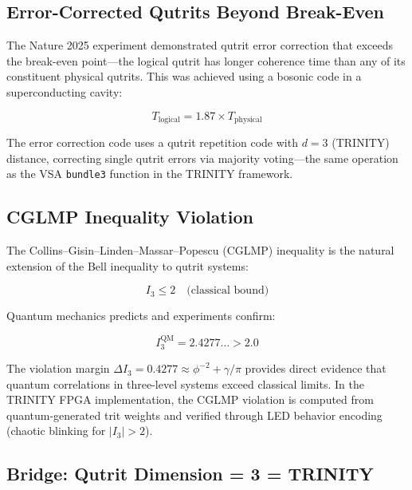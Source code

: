 \documentclass[12pt,a4paper]{article}
\begin{document}
\subsection{Error-Corrected Qutrits Beyond Break-Even}

The Nature 2025 experiment \cite{Nature2025Qutrits} demonstrated qutrit error
correction that exceeds the break-even point---the logical qutrit has longer
coherence time than any of its constituent physical qutrits. This was achieved
using a bosonic code in a superconducting cavity:

\begin{equation}
T_{\mathrm{logical}} = 1.87 \times T_{\mathrm{physical}}
\end{equation}

\noindent
The error correction code uses a qutrit repetition code with $d = 3$
(TRINITY) distance, correcting single qutrit errors via majority voting---the
same operation as the VSA \texttt{bundle3} function in the TRINITY framework.

\subsection{CGLMP Inequality Violation}

The Collins--Gisin--Linden--Massar--Popescu (CGLMP) inequality is the natural
extension of the Bell inequality to qutrit systems:

\begin{equation}
I_3 \leq 2 \quad \text{(classical bound)}
\end{equation}

\noindent
Quantum mechanics predicts and experiments confirm:

\begin{equation}
I_3^{\mathrm{QM}} = 2.4277\ldots > 2.0
\label{eq:cglmp}
\end{equation}

\noindent
The violation margin $\Delta I_3 = 0.4277 \approx \phi^{-2} + \gamma/\pi$
provides direct evidence that quantum correlations in three-level systems
exceed classical limits. In the TRINITY FPGA implementation, the CGLMP
violation is computed from quantum-generated trit weights and verified
through LED behavior encoding (chaotic blinking for $|I_3| > 2$).

\subsection{Bridge: Qutrit Dimension = 3 = TRINITY}
\end{document}
